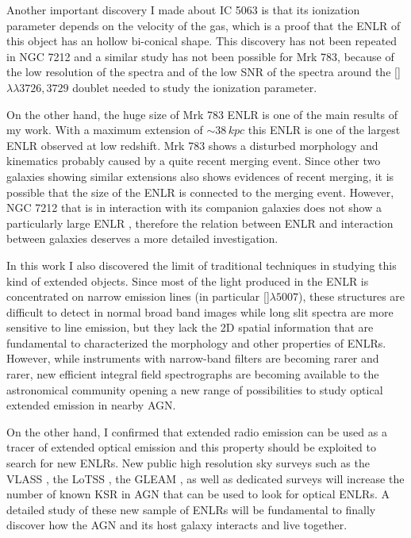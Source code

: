 \documentclass[../main.tex]{subfiles}
\begin{document}
Another important discovery I made about IC 5063 is that its ionization parameter depends on the velocity of the gas, which is a proof that the ENLR of this object has an hollow bi-conical shape.
This discovery has not been repeated in NGC 7212 and a similar study has not been possible for Mrk 783, because of the low resolution of the spectra and of the low SNR of the spectra around the []$\lambda\lambda3726,3729$ doublet needed to study the ionization parameter.

On the other hand, the huge size of Mrk 783 ENLR is one of the main results of my work.
With a maximum extension of $\sim 38\,\si{kpc}$ this ENLR is one of the largest ENLR observed at low redshift.
Mrk 783 shows a disturbed morphology and kinematics probably caused by a quite recent merging event.
Since other two galaxies showing similar extensions \citep[UGC 7342 and NGC 5972][]{Keel12} also shows evidences of recent merging, it is possible that the size of the ENLR is connected to the merging event.
However, NGC 7212 that is in interaction with its companion galaxies does not show a particularly large ENLR \citep{Cracco11}, therefore the relation between ENLR and interaction between galaxies deserves a more detailed investigation.

In this work I also discovered the limit of traditional techniques in studying this kind of extended objects.
Since most of the light produced in the ENLR is concentrated on narrow emission lines (in particular []$\lambda5007$), these structures are difficult to detect in normal broad band images \citep[e.g.][]{Sun18} while long slit spectra are more sensitive to line emission, but they lack the 2D spatial information that are fundamental to characterized the morphology and other properties of ENLRs.
However, while instruments with narrow-band filters are becoming rarer and rarer, new efficient integral field spectrographs are becoming available to the astronomical community opening a new range of possibilities to study optical extended emission in nearby AGN.

On the other hand, I confirmed that extended radio emission can be used as a tracer of extended optical emission and this property should be exploited to search for new ENLRs.
New public high resolution sky surveys such as the VLASS \citep[VLA Sky Survey][]{Hales13}, the LoTSS \citep[LOFAR two meter sky survey][]{Shimwell17}, the GLEAM \citep[GaLactic and Extragalactic All-sky MWA Survey][]{Hurley17}, as well as dedicated surveys will increase the number of known KSR in AGN that can be used to look for optical ENLRs.
A detailed study of these new sample of ENLRs will be fundamental to finally discover how the AGN and its host galaxy interacts and live together.
\end{document}

